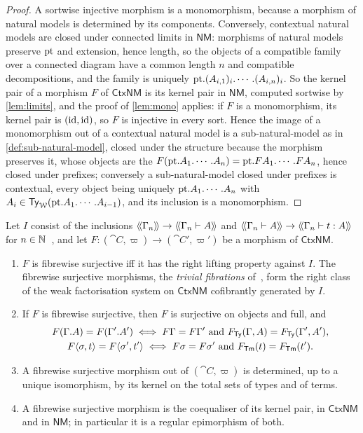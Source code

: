 \begin{proof}
    A sortwise injective morphism is a monomorphism, because a morphism of natural models is determined by its components. Conversely, contextual natural models are closed under connected limits in $\mathsf{NM}$: morphisms of natural models preserve $\mathrm{pt}$ and extension, hence length, so the objects of a compatible family over a connected diagram have a common length $n$ and compatible decompositions, and the family is uniquely $\mathrm{pt}.(A_{i,1})_i.\cdots.(A_{i,n})_i$. So the kernel pair of a morphism $F$ of $\mathsf{CtxNM}$ is its kernel pair in $\mathsf{NM}$, computed sortwise by \cref{lem:limits}, and the proof of \cref{lem:mono} applies: if $F$ is a monomorphism, its kernel pair is $(\mathrm{id}, \mathrm{id})$, so $F$ is injective in every sort. Hence the image of a monomorphism out of a contextual natural model is a sub-natural-model as in \cref{def:sub-natural-model}, closed under the structure because the morphism preserves it, whose objects are the $F(\mathrm{pt}.A_1.\cdots.A_n) = \mathrm{pt}.FA_1.\cdots.FA_n$, hence closed under prefixes; conversely a sub-natural-model closed under prefixes is contextual, every object being uniquely $\mathrm{pt}.A_1.\cdots.A_n$ with $A_i \in \mathsf{Ty}_{\mathcal{W}}(\mathrm{pt}.A_1.\cdots.A_{i-1})$, and its inclusion is a monomorphism.
\end{proof}

\begin{proposition}\label{prop:trivial-fibrations}
    Let $I$ consist of the inclusions $\langle\!\langle \Gamma_n \rangle\!\rangle \to \langle\!\langle \Gamma_n \vdash A \rangle\!\rangle$ and $\langle\!\langle \Gamma_n \vdash A \rangle\!\rangle \to \langle\!\langle \Gamma_n \vdash t : A \rangle\!\rangle$ for $n \in \mathbb{N}$~\cite[Def.~3.10]{KapulkinLumsdaine2018}, and let $F : (\cat{C}, \varpi) \to (\cat{C}', \varpi')$ be a morphism of $\mathsf{CtxNM}$.
    \begin{enumerate}
        \item $F$ is fibrewise surjective iff it has the right lifting property against $I$. The fibrewise surjective morphisms, the \emph{trivial fibrations} of~\cite[Def.~3.11]{KapulkinLumsdaine2018}, form the right class of the weak factorisation system on $\mathsf{CtxNM}$ cofibrantly generated by $I$.
        \item If $F$ is fibrewise surjective, then $F$ is surjective on objects and full, and
        \begin{gather*}
            F(\Gamma.A) = F(\Gamma'.A') \iff F\Gamma = F\Gamma' \text{ and } F_{\mathsf{Ty}}(\Gamma, A) = F_{\mathsf{Ty}}(\Gamma', A'),\\
            F\langle \sigma, t \rangle = F\langle \sigma', t' \rangle \iff F\sigma = F\sigma' \text{ and } F_{\mathsf{Tm}}(t) = F_{\mathsf{Tm}}(t').
        \end{gather*}
        \item A fibrewise surjective morphism out of $(\cat{C}, \varpi)$ is determined, up to a unique isomorphism, by its kernel on the total sets of types and of terms.
        \item A fibrewise surjective morphism is the coequaliser of its kernel pair, in $\mathsf{CtxNM}$ and in $\mathsf{NM}$; in particular it is a regular epimorphism of both.
    \end{enumerate}
\end{proposition}

